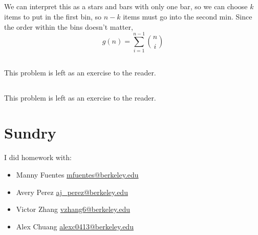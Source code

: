 \documentclass{article}
\begin{document}
\subsection{}

We can interpret this as a stars and bars with only one bar, so we can choose \(k\) items to put in the first bin, so \(n - k\) items must go into the second min.
Since the order within the bins doesn't matter,
\begin{equation}
    g(n) = \sum_{i = 1}^{n - 1} \binom{n}{i}
\end{equation}

\subsection{}

This problem is left as an exercise to the reader.

\subsection{}

This problem is left as an exercise to the reader.

\section{Sundry}

I did homework with:
\begin{itemize}
    \item Manny Fuentes \href{mailto:mfuentes@berkeley.edu}{mfuentes@berkeley.edu}
    \item Avery Perez \href{mailto:aj_perez@berkeley.edu}{aj\_perez@berkeley.edu}
    \item Victor Zhang \href{mailto:vzhang6@berkeley.edu}{vzhang6@berkeley.edu}
    \item Alex Chuang \href{mailto:alexc0413@berkeley.edu}{alexc0413@berkeley.edu}
\end{itemize}
\end{document}
